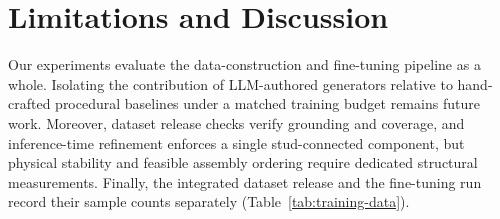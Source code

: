 \section{Limitations and Discussion}
Our experiments evaluate the data-construction and fine-tuning pipeline as a whole. Isolating the contribution of LLM-authored generators relative to hand-crafted procedural baselines under a matched training budget remains future work. Moreover, dataset release checks verify grounding and coverage, and inference-time refinement enforces a single stud-connected component, but physical stability and feasible assembly ordering require dedicated structural measurements. Finally, the integrated dataset release and the fine-tuning run record their sample counts separately (Table~\ref{tab:training-data}).
